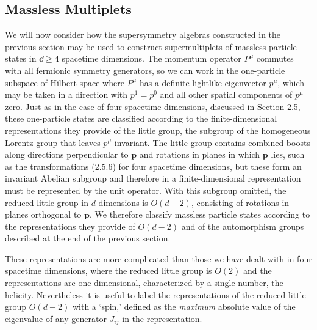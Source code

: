 
\subsection{Massless Multiplets}

We will now consider how the supersymmetry algebras constructed in the
previous section may be used to construct supermultiplets of massless
particle states in \(\dd\geq4\) spacetime dimensions. The momentum operator
\(P^\mu\) commutes with all fermionic symmetry generators, so we can work
in the one-particle subspace of Hilbert space where \(P^\mu\) has a definite
lightlike eigenvector \(p^\mu\), which may be taken in a direction with
\(p^1=p^0\) and all other spatial components of \(p^\mu\) zero. Just as in
the case of four spacetime dimensions, discussed in Section 2.5, these
one-particle states are classified according to the finite-dimensional
representations they provide of the little group, the subgroup of the
homogeneous Lorentz group that leaves \(p^\mu\) invariant. The little group
contains combined boosts along directions perpendicular to \(\mathbf p\)
and rotations in planes in which \(\mathbf p\) lies, such as the
transformations (2.5.6) for four spacetime dimensions, but these form an
invariant Abelian subgroup and therefore in a finite-dimensional
representation must be represented by the unit operator. With this
subgroup omitted, the reduced little group in \(d\) dimensions is
\(O(d-2)\), consisting of rotations in planes orthogonal to \(\mathbf p\).
We therefore classify massless particle states according to the
representations they provide of \(O(d-2)\) and of the automorphism groups
described at the end of the previous section.

These representations are more complicated than those we have dealt with
in four spacetime dimensions, where the reduced little group is \(O(2)\)
and the representations are one-dimensional, characterized by a single
number, the helicity. Nevertheless it is useful to label the
representations of the reduced little group \(O(d-2)\) with a `spin,'
defined as the \emph{maximum} absolute value of the eigenvalue of any
generator \(J_{ij}\) in the representation.

